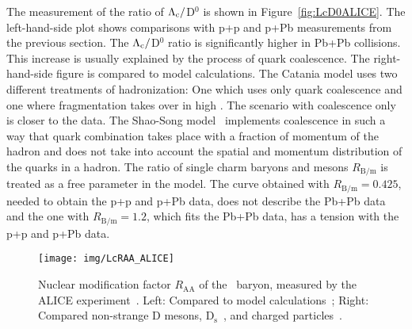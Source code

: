 The measurement of the ratio of ${\Lambda_\text{c}}/$D$^0$ is shown in Figure~\ref{fig:LcD0ALICE}. The left-hand-side plot shows comparisons with p+p and p+Pb measurements from the previous section. The ${\Lambda_\text{c}}/$D$^0$ ratio is significantly higher in Pb+Pb collisions. This increase is usually explained by the process of quark coalescence. The right-hand-side figure is compared to model calculations. The Catania model uses two different treatments of hadronization: One which uses only quark coalescence and one where fragmentation takes over in high \pt\@. The scenario with coalescence only is closer to the data. The Shao-Song model~\cite{LcPPbModelShaoSong, ShaoSongPP} implements coalescence in such a way that quark combination takes place with a fraction of momentum of the hadron and does not take into account the spatial and momentum distribution of the quarks in a hadron. The ratio of single charm baryons and mesons $R_\mathrm{B/m}$ is treated as a free parameter in the model. The curve obtained with  $R_\mathrm{B/m} = 0.425$, needed to obtain the p+p and p+Pb data, does not describe the Pb+Pb data and the one with $R_\mathrm{B/m} = 1.2$, which fits the Pb+Pb data, has a tension with the p+p and p+Pb data.

\begin{figure}[!htb]
\centering
\texttt{[image: img/LcRAA\_ALICE]}
\caption[Nuclear modification factor $R_\mathrm{AA}$ of the \Lambdac\ baryon, measured by the ALICE experiment.]{Nuclear modification factor $R_\mathrm{AA}$ of the \Lambdac\ baryon, measured by the ALICE experiment~\cite{AlicePbPb}\@. Left: Compared to model calculations~\cite{Catania}; Right: Compared non-strange D mesons, D$_\mathrm{s}$~\cite{AliceD}, and charged particles~\cite{AliceCharged}.}
\label{fig:LcRaaALICE}
\end{figure}


